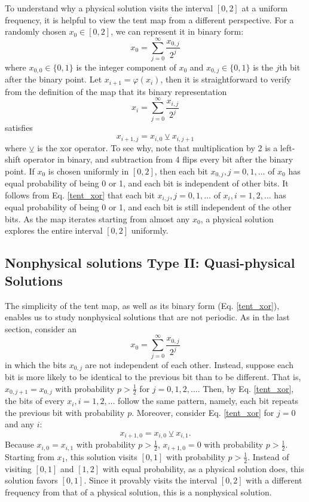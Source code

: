 To understand why a physical solution visits the interval $[0,2]$ at a uniform
frequency, it is helpful to view the tent map from a different perspective.
For a randomly chosen $x_0\in[0,2]$, we can represent it in binary form:
\begin{equation}
    x_0 = \sum_{j=0}^{\infty} \frac{x_{0,j}}{2^j}
\end{equation}
where $x_{0,0}\in\{0,1\}$ is the integer component of $x_0$ and $x_{0,j}\in\{0,1\}$ is the $j$th bit after the binary point.
Let $x_{i+1} = \varphi(x_i)$, then it is straightforward to verify from the definition
of the map that its binary representation
\begin{equation}
    x_i = \sum_{j=0}^{\infty} \frac{x_{i,j}}{2^j}
\end{equation}
satisfies
\begin{equation} \label{tent_xor}
    x_{i+1,j} = x_{i,0} \veebar x_{i,j+1}
\end{equation}
where $\veebar$ is the xor operator. To see why, note that 
multiplication by 2 is a left-shift operator in binary, and 
subtraction from 4 flips every bit after the binary point. If $x_0$ is chosen uniformly in $[0,2]$, then each bit $x_{0,j},j=0,1,\ldots$ of $x_0$
has equal probability of being 0 or 1, and each bit is independent of other bits.
It follows from Eq. \ref{tent_xor} that each bit $x_{i,j},j=0,1,\ldots$ of $x_i,
i=1,2,\ldots$ has equal probability of being 0 or 1,
and each bit is still independent of the other bits.
As the map iterates starting from almost any $x_0$, a physical solution explores the entire interval $[0,2]$ uniformly.

\subsection{Nonphysical solutions Type II: Quasi-physical Solutions}
\label{sec:quasiphysical}
The simplicity of the tent map, as well as its binary form (Eq. \ref{tent_xor}),
enables us to study nonphysical solutions that are not periodic.
As in the last section, consider an
\begin{equation}
    x_0 = \sum_{j=0}^{\infty} \frac{x_{0,j}}{2^j}
\end{equation}
in which the bits $x_{0,j}$ are not independent of each other.  Instead,
suppose each bit is more likely to be identical to the previous bit than to be different.
That is, $x_{0,j+1}=x_{0,j}$ with probability $p>\frac12$ for $j=0,1,2,\ldots$.
Then, by Eq. \ref{tent_xor}, the bits of every $x_i, i=1,2,\ldots$ follow the same pattern, namely, each bit repeats the previous bit
with probability $p$. Moreover, consider Eq. \ref{tent_xor} 
for $j=0$ and any $i$:
\begin{equation}
    x_{i+1,0} = x_{i,0} \veebar x_{i,1}.
\end{equation}
Because $x_{i,0}=x_{i,1}$ with probability $p>\frac12$, $x_{i+1,0}=0$ with probability 
$p>\frac12$.  Starting from $x_1$, this solution visits $[0,1]$ with
probability $p>\frac12$.  Instead of visiting $[0,1]$ and $[1,2]$ with
equal probability, as a physical solution does, this solution favors $[0,1]$. Since it provably visits the interval $[0,2]$ with a different frequency from that
of a physical solution, this is a nonphysical solution.

